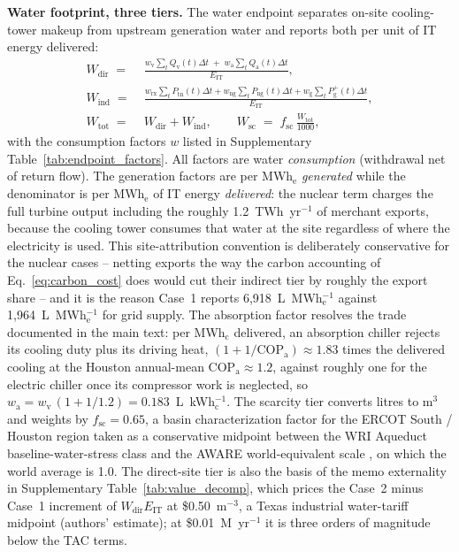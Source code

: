 \documentclass[a4paper,fleqn]{cas-sc}
\newcommand{\runinhead}[1]{\par\smallskip\noindent\textbf{#1.}\quad}
\begin{document}
\runinhead{Water footprint, three tiers}
The water endpoint separates on-site cooling-tower makeup from upstream generation water and reports both per unit of IT energy delivered:
\begin{align}
W_\mathrm{dir} \;=\;& \frac{w_\mathrm{v} \sum_t Q_\mathrm{v}(t)\Delta t \;+\; w_\mathrm{a} \sum_t Q_\mathrm{a}(t)\Delta t}{E_\mathrm{IT}}, \label{eq:water_direct}\\
W_\mathrm{ind} \;=\;& \frac{w_\mathrm{rx} \sum_t P_\mathrm{tn}(t)\Delta t + w_\mathrm{ng} \sum_t P_\mathrm{ng}(t)\Delta t + w_\mathrm{g} \sum_t P_\mathrm{g}^{+}(t)\Delta t}{E_\mathrm{IT}}, \label{eq:water_indirect}\\
W_\mathrm{tot} \;=\;& W_\mathrm{dir} + W_\mathrm{ind}, \qquad
W_\mathrm{sc} \;=\; f_\mathrm{sc}\, \frac{W_\mathrm{tot}}{1000}, \label{eq:water_scarcity}
\end{align}
with the consumption factors $w$ listed in Supplementary Table~\ref{tab:endpoint_factors}. All factors are water \emph{consumption} (withdrawal net of return flow). The generation factors are per MWh$_\mathrm{e}$ \emph{generated} while the denominator is per MWh$_\mathrm{e}$ of IT energy \emph{delivered}: the nuclear term charges the full turbine output including the roughly 1.2~TWh~yr$^{-1}$ of merchant exports, because the cooling tower consumes that water at the site regardless of where the electricity is used. This site-attribution convention is deliberately conservative for the nuclear cases -- netting exports the way the carbon accounting of Eq.~\eqref{eq:carbon_cost} does would cut their indirect tier by roughly the export share -- and it is the reason Case~1 reports 6{,}918~L~MWh$_\mathrm{e}^{-1}$ against 1{,}964~L~MWh$_\mathrm{e}^{-1}$ for grid supply. The absorption factor resolves the trade documented in the main text: per MWh$_\mathrm{c}$ delivered, an absorption chiller rejects its cooling duty plus its driving heat, $(1+1/\mathrm{COP}_\mathrm{a})\approx 1.83$ times the delivered cooling at the Houston annual-mean $\mathrm{COP}_\mathrm{a}\approx1.2$, against roughly one for the electric chiller once its compressor work is neglected, so $w_\mathrm{a} = w_\mathrm{v}\,(1+1/1.2) = 0.183$~L~kWh$_\mathrm{c}^{-1}$. The scarcity tier converts litres to m$^3$ and weights by $f_\mathrm{sc}=0.65$, a basin characterization factor for the ERCOT South / Houston region taken as a conservative midpoint between the WRI Aqueduct baseline-water-stress class \citep{wri2023aqueduct} and the AWARE world-equivalent scale \citep{boulay2018aware}, on which the world average is 1.0. The direct-site tier is also the basis of the memo externality in Supplementary Table~\ref{tab:value_decomp}, which prices the Case~2 minus Case~1 increment of $W_\mathrm{dir} E_\mathrm{IT}$ at \$0.50~m$^{-3}$, a Texas industrial water-tariff midpoint (authors' estimate); at \$0.01~M~yr$^{-1}$ it is three orders of magnitude below the TAC terms.
\end{document}
